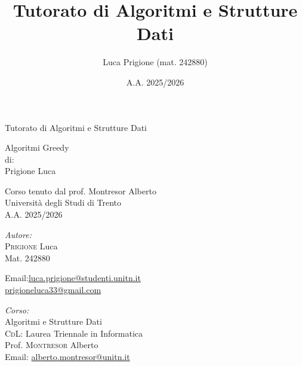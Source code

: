 \documentclass[a4paper,twoside]{report}
\title{Tutorato di Algoritmi e Strutture Dati}
\author{Luca Prigione (mat. 242880)}
\date{A.A. 2025/2026}
\begin{document}
    

    \begin{titlepage}
        \centering  %
        
        {\Huge\textbf\hfill{Tutorato di Algoritmi e Strutture Dati}\hfill} %
        \vspace{1.5cm}

        {\Large Algoritmi Greedy} \\[1cm] %

        
        {\normalsize di: } \\[.3cm]
        {\Large Prigione Luca} \\ %
        \vspace{1.5cm}
        

        {\normalsize Corso tenuto dal prof. Montresor Alberto} \\[0.3cm] %
        {\large Università degli Studi di Trento} \\[1.5cm]
        
        {\large A.A. 2025/2026} \\[3cm] %
        
        \vfill
        \begin{minipage}[t]{0.4\textwidth}
            \begin{flushleft} \normalsize
                \emph{Autore:}\\
                \textsc{Prigione} Luca \\ %
                Mat. 242880 \\
                \vspace{-\baselineskip}
                \begin{tabbing}
                    Email:\= \href{mailto:luca.prigione@studenti.unitn.it}{luca.prigione@studenti.unitn.it} \\
                        \>  \href{mailto:prigioneluca33@gmail.com}{prigioneluca33@gmail.com}
                \end{tabbing}
            \end{flushleft}
        \end{minipage}%
        \hfill
        \begin{minipage}[t]{0.4\textwidth}
            \begin{flushleft} \normalsize
                \emph{Corso:}\\
                Algoritmi e Strutture Dati \\
                \textsc{CdL}: Laurea Triennale in Informatica \\
                Prof. \textsc{Montresor} Alberto \\
                Email: \href{mailto:alberto.montresor@unitn.it}{alberto.montresor@unitn.it}
            \end{flushleft}
        \end{minipage}
        \vfill
    \end{titlepage}
    
    
\end{document}
